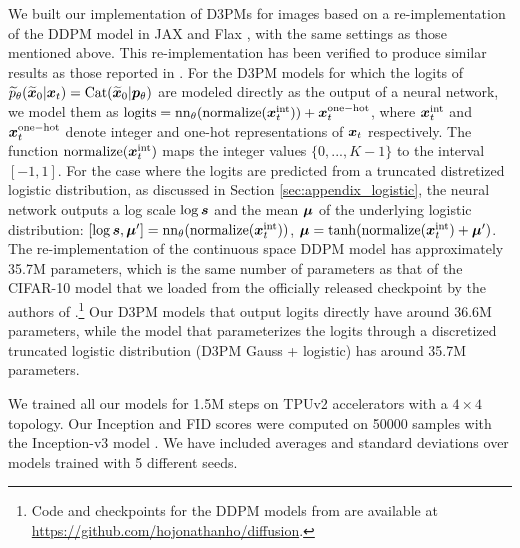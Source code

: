 We built our implementation of D3PMs for images based on
a re-implementation of the DDPM model \citep{ho2020denoising} in JAX \citep{jax2018github} and Flax \citep{flax2020github}, with the same settings as those mentioned above. This re-implementation has been verified to produce similar results as those reported in \citep{ho2020denoising}. 
For the D3PM models for which the logits of $\widetilde{p}_{\theta}(\widetilde{\boldsymbol{x}}_0|\boldsymbol{x}_t) = \mathrm{Cat}(\widetilde{\boldsymbol{x}}_0|\boldsymbol{p}_{\theta})$ are modeled directly as the output of a neural network, we model them as $\mathrm{logits} = \mathrm{nn}_{\theta}(\mathrm{normalize}(\boldsymbol{x}^{\mathrm{int}}_t)) + \boldsymbol{x}^{\mathrm{one-hot}}_t$, where $\boldsymbol{x}^{\mathrm{int}}_t$ and $\boldsymbol{x}^{\mathrm{one-hot}}_t$ denote integer and one-hot representations of $\boldsymbol{x}_t$ respectively. The function $\mathrm{normalize}(\boldsymbol{x}^{\mathrm{int}}_t)$ maps the integer values $\{0, ..., K-1\}$ to the interval $[-1, 1]$. For the case where the logits are predicted from a truncated distretized logistic distribution, as discussed in Section \ref{sec:appendix_logistic}, the neural network outputs a log scale $\log \boldsymbol{s}$ and the mean $\boldsymbol{\mu}$ of the underlying logistic distribution: $[\log \boldsymbol{s}, \boldsymbol{\mu}'] = \mathrm{nn}_{\theta}(\mathrm{normalize}(\boldsymbol{x}^{\mathrm{int}}_t))$, $\boldsymbol{\mu} = \tanh(\mathrm{normalize}(\boldsymbol{x}^{\mathrm{int}}_t) + \boldsymbol{\mu}')$.
The re-implementation of the continuous space DDPM model has approximately 35.7M parameters, which is the same number of parameters as that of the CIFAR-10 model that we loaded from the officially released checkpoint by the authors of \citep{ho2020denoising}.\footnote{Code and checkpoints for the DDPM models from \citep{ho2020denoising} are available at \url{https://github.com/hojonathanho/diffusion}.}
Our D3PM models that output logits directly have around 36.6M parameters, while the model that parameterizes the logits through a discretized truncated logistic distribution (D3PM Gauss + logistic) has around 35.7M parameters. 

We trained all our models for 1.5M steps on TPUv2 accelerators with a $4\times4$ topology. 
Our Inception \citep{salimans2016improved} and FID \citep{heusel2017gans} scores were computed on 50000 samples with the Inception-v3 model \citep{Szegedy_2016_CVPR}. We have included averages and standard deviations over models trained with 5 different seeds.

